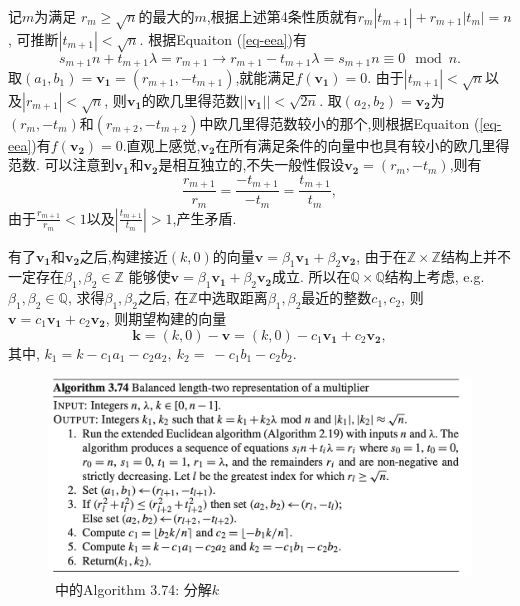 \documentclass{article}
\newcommand{\Z}{\mathbb{Z}}
\newcommand{\Q}{\mathbb{Q}}
\begin{document}
记$m$为满足 $r_m \ge \sqrt{n}$的最大的$m$,根据上述第4条性质就有$r_m|t_{m+1}| + r_{m+1}|t_m| = n$, 可推断$|t_{m+1}|<\sqrt{n}$.
根据Equaiton (\ref{eq-eea})有
$$s_{m+1}n + t_{m+1}\lambda = r_{m+1} \rightarrow r_{m+1} - t_{m+1} \lambda = s_{m+1} n \equiv 0 \mod n.$$
取$(a_1, b_1) = \mathbf{v_1}  = (r_{m+1}, - t_{m+1})$,就能满足$f(\mathbf{v_1}) = 0$.
由于$|t_{m+1}|<\sqrt{n}$以及$|r_{m+1}| < \sqrt{n}$, 则$\mathbf{v_1}$的欧几里得范数$||\mathbf{v_1}|| <\sqrt{2n}$.
取$(a_2, b_2) = \mathbf{v_2}$为$(r_{m}, - t_{m})$和$(r_{m+2}, - t_{m+2})$中欧几里得范数较小的那个,则根据Equaiton (\ref{eq-eea})有$f(\mathbf{v_2}) = 0$.直观上感觉,$\mathbf{v_2}$在所有满足条件的向量中也具有较小的欧几里得范数.
可以注意到$\mathbf{v_1}$和$\mathbf{v_2}$是相互独立的,不失一般性假设$\mathbf{v_2}=(r_m,-t_m)$,则有
$$
\dfrac{r_{m+1}}{r_m} = \dfrac{-t_{m+1}}{-t_m} = \dfrac{t_{m+1}}{t_m},
$$
由于$\frac{r_{m+1}}{r_m} < 1$以及$|\frac{t_{m+1}}{t_m}| > 1$,产生矛盾.

有了$\mathbf{v_1}$和$\mathbf{v_2}$之后,构建接近$(k,0)$的向量$\mathbf{v} = \beta_1\mathbf{v_1} + \beta_2\mathbf{v_2}$,
由于在$\Z\times\Z$结构上并不一定存在$\beta_1, \beta_2 \in \Z$
能够使$\mathbf{v} = \beta_1\mathbf{v_1} + \beta_2\mathbf{v_2}$成立.
所以在$\Q\times\Q$结构上考虑, e.g. $\beta_1, \beta_2 \in \Q$,
求得$\beta_1, \beta_2$之后, 在$\Z$中选取距离$\beta_1, \beta_2$最近的整数$c_1, c_2$,
则$\mathbf{v} = c_1\mathbf{v_1} + c_2\mathbf{v_2}$, 则期望构建的向量 
$$\mathbf{k} = (k,0) - \mathbf{v} = (k, 0) - c_1\mathbf{v_1} + c_2\mathbf{v_2},$$
其中, $k_1 =  k - c_1a_1 - c_2a_2, \ k_2 = \ -c_1b_1-c_2b_2$.

\begin{figure}[h]
\centering
\caption{\cite{guidetoecc}~中的Algorithm 3.74: 分解$k$}\label{fig-splitk}
\includegraphics[width=\textwidth]{split-k.png}
\end{figure}
\end{document}

